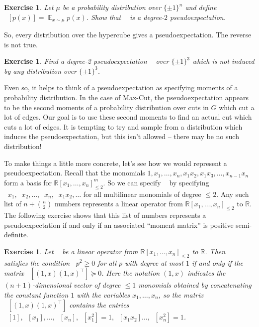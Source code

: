 \documentclass[11pt]{article}
\newtheorem{exercise}[theorem]{Exercise}
\newcommand{\R}{\mathbb{R}} %
\DeclareMathOperator{\E}{\mathbb{E}} %
\DeclareMathOperator{\pE}{\widetilde{\mathbb{E}}} %
\begin{document}
\begin{exercise}
Let $\mu$ be a probability distribution over $\{ \pm 1\}^n$ and define $\pE[p(x)] = \E_{x \sim \mu} p(x)$.
Show that $\pE$ is a degree-$2$ pseudoexpectation.
\end{exercise}

So, every distribution over the hypercube gives a pseudoexpectation.
The reverse is not true.

\begin{exercise}
Find a degree-2 pseudoexpectation $\pE$ over $\{ \pm 1\}^3$ which is not induced by any distribution over $\{ \pm 1\}^3$.
\end{exercise}

Even so, it helps to think of a pseudoexpectation as specifying moments of a probability distribution.
In the case of Max-Cut, the pseudoexpectation appears to be the second moments of a probability distribution over cuts in $G$ which cut a lot of edges.
Our goal is to use these second moments to find an actual cut which cuts a lot of edges.
It is tempting to try and sample from a distribution which induces the pseudoexpectation, but this isn't allowed -- there may be no such distribution!

To make things a little more concrete, let's see how we would represent a pseudoexpectation.
Recall that the monomials $1, x_1,\ldots,x_n,x_1 x_2, x_1 x_3,\ldots,x_{n-1}x_n$ form a basis for $\R[x_1,\ldots,x_n]_{\leq 2}^m$.
So we can specify $\pE$ by specifying $\pE x_1,\pE x_2,\ldots,\pE x_n, \pE x_1 x_2, \ldots$ for all multilinear monomials of degree $\leq 2$.
Any such list of $n + \binom{n}{2}$ numbers represents a linear operator from $\R[x_1,\ldots,x_n]_{\leq 2}$ to $\R$.
The following exercise shows that this list of numbers represents a pseudoexpectation if and only if an associated ``moment matrix'' is positive semi-definite.

\begin{exercise}
  Let $\pE$ be a linear operator from $\R[x_1,\ldots,x_n]_{\leq 2}$ to $\R$.
  Then $\pE$ satisfies the condition $\pE p^2 \geq 0$ for all $p$ with degree at most $1$ if and only if the matrix $\pE[(1,x)(1,x)^\top] \succeq 0$.
  Here the notation $(1,x)$ indicates the $(n+1)$-dimensional vector of degree $\leq 1$ monomials obtained by concatenating the constant function $1$ with the variables $x_1,\ldots,x_n$, so the matrix $\pE[(1,x)(1,x)^\top]$ contains the entries $\pE[1], \pE[x_1], \ldots, \pE[x_n], \pE[x_1^2] = 1, \pE[x_1 x_2] \ldots, \pE[x_n^2]=1$.
\end{exercise}
\end{document}
